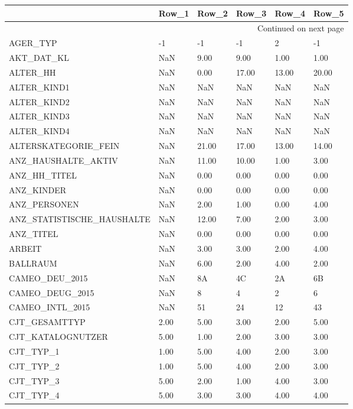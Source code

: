 \begin{longtable}{lp{1cm}p{1cm}p{1cm}p{1cm}p{1cm}}
\toprule
{} & Row\_1 & Row\_2 & Row\_3 & Row\_4 & Row\_5 \\
\midrule
\endhead
\midrule
\multicolumn{6}{r}{{Continued on next page}} \\
\midrule
\endfoot

\bottomrule
\endlastfoot
AGER\_TYP & -1 & -1 & -1 & 2 & -1 \\
AKT\_DAT\_KL & NaN & 9.00 & 9.00 & 1.00 & 1.00 \\
ALTER\_HH & NaN & 0.00 &  17.00 &  13.00 &  20.00 \\
ALTER\_KIND1 & NaN & NaN & NaN & NaN & NaN \\
ALTER\_KIND2 & NaN & NaN & NaN & NaN & NaN \\
ALTER\_KIND3 & NaN & NaN & NaN & NaN & NaN \\
ALTER\_KIND4 & NaN & NaN & NaN & NaN & NaN \\
ALTERSKATEGORIE\_FEIN & NaN &  21.00 &  17.00 &  13.00 &  14.00 \\
ANZ\_HAUSHALTE\_AKTIV  & NaN &  11.00 &  10.00 & 1.00 & 3.00 \\
ANZ\_HH\_TITEL  & NaN & 0.00 & 0.00 & 0.00 & 0.00 \\
ANZ\_KINDER & NaN & 0.00 & 0.00 & 0.00 & 0.00 \\
ANZ\_PERSONEN  & NaN & 2.00 & 1.00 & 0.00 & 4.00 \\
ANZ\_STATISTISCHE\_HAUSHALTE  & NaN &  12.00 & 7.00 & 2.00 & 3.00 \\
ANZ\_TITEL & NaN & 0.00 & 0.00 & 0.00 & 0.00 \\
ARBEIT & NaN & 3.00 & 3.00 & 2.00 & 4.00 \\
BALLRAUM & NaN & 6.00 & 2.00 & 4.00 & 2.00 \\
CAMEO\_DEU\_2015   & NaN & 8A & 4C & 2A & 6B \\
CAMEO\_DEUG\_2015  & NaN & 8 & 4 & 2 & 6 \\
CAMEO\_INTL\_2015  & NaN & 51 & 24 & 12 & 43 \\
CJT\_GESAMTTYP    &   2.00 & 5.00 & 3.00 & 2.00 & 5.00 \\
CJT\_KATALOGNUTZER  &   5.00 & 1.00 & 2.00 & 3.00 & 3.00 \\
CJT\_TYP\_1 &   1.00 & 5.00 & 4.00 & 2.00 & 3.00 \\
CJT\_TYP\_2 &   1.00 & 5.00 & 4.00 & 2.00 & 3.00 \\
CJT\_TYP\_3 &   5.00 & 2.00 & 1.00 & 4.00 & 3.00 \\
CJT\_TYP\_4 &   5.00 & 3.00 & 3.00 & 4.00 & 4.00 \\

\end{longtable}
